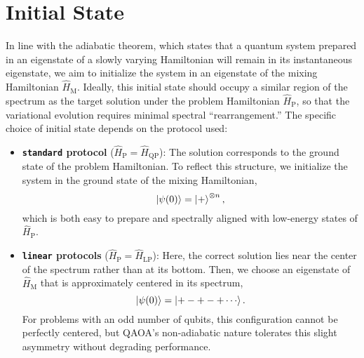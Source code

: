\section{Initial State}
\label{Section:InitialState}

In line with the adiabatic theorem, which states that a quantum system prepared in an eigenstate of a slowly varying Hamiltonian will remain in its instantaneous eigenstate, we aim to initialize the system in an eigenstate of the mixing Hamiltonian $\hat{H}_\mathrm{M}$. Ideally, this initial state should occupy a similar region of the spectrum as the target solution under the problem Hamiltonian $\hat{H}_\mathrm{P}$, so that the variational evolution requires minimal spectral “rearrangement.” The specific choice of initial state depends on the protocol used:

\begin{itemize}
    \item \textbf{\texttt{standard} protocol} ($\hat{H}_\mathrm{P} = \hat{H}_\mathrm{QP}$):  
    The solution corresponds to the ground state of the problem Hamiltonian. To reflect this
    structure, we initialize the system in the ground state of the mixing Hamiltonian,  
    $$\ket{\psi (0)} = \ket{+}^{\otimes n},$$ which is both easy to prepare and spectrally
    aligned with low-energy states of$\hat{H}_\mathrm{P}$.

    \item \textbf{\texttt{linear} protocols} ($\hat{H}_\mathrm{P} = \hat{H}_\mathrm{LP}$):  
    Here, the correct solution lies near the center of the spectrum rather than at its bottom.
    Then, we choose an eigenstate of $\hat{H}_\mathrm{M}$ that is approximately centered
    in its spectrum, $$\ket{\psi (0)} = \ket{+-+-+\cdots}.$$ For problems with an odd number
    of qubits, this configuration cannot be perfectly centered, but QAOA's non-adiabatic
    nature tolerates this slight asymmetry without degrading performance.
\end{itemize}
